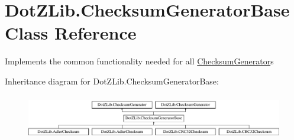 \hypertarget{class_dot_z_lib_1_1_checksum_generator_base}{}\section{Dot\+Z\+Lib.\+Checksum\+Generator\+Base Class Reference}
\label{class_dot_z_lib_1_1_checksum_generator_base}


Implements the common functionality needed for all \hyperlink{interface_dot_z_lib_1_1_checksum_generator}{Checksum\+Generator}s  


Inheritance diagram for Dot\+Z\+Lib.\+Checksum\+Generator\+Base\+:\begin{figure}[H]
\begin{center}
\leavevmode
\includegraphics[height=1.981132cm]{class_dot_z_lib_1_1_checksum_generator_base}
\end{center}
\end{figure}

